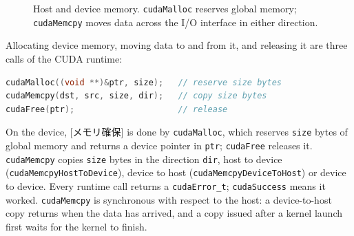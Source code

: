 \documentclass[../main.tex]{subfiles}
\begin{document}
\begin{figure}[tb]
  \centering
  
  \caption{Host and device memory.  \texttt{cudaMalloc} reserves global
    memory; \texttt{cudaMemcpy} moves data across the I/O interface in
    either direction.}
  \label{fig:l03-host-device}
\end{figure}

Allocating device memory, moving data to and from it, and releasing it
are three calls of the CUDA runtime:
\begin{lstlisting}[language=C++, numbers=none]
cudaMalloc((void **)&ptr, size);   // reserve size bytes
cudaMemcpy(dst, src, size, dir);   // copy size bytes
cudaFree(ptr);                     // release
\end{lstlisting}

\begin{definition}
  On the device, [メモリ確保] is done by
  \texttt{cudaMalloc}, which reserves \texttt{size} bytes of global
  memory and returns a device pointer in \texttt{ptr}; \texttt{cudaFree}
  releases it.  \texttt{cudaMemcpy} copies \texttt{size} bytes in the
  direction \texttt{dir}, host to device
  (\texttt{cudaMemcpyHostToDevice}), device to host
  (\texttt{cudaMemcpyDeviceToHost}) or device to device.  Every runtime
  call returns a \texttt{cudaError\_t}; \texttt{cudaSuccess} means it
  worked.  \texttt{cudaMemcpy} is synchronous with respect to the host:
  a device-to-host copy returns when the data has arrived, and a copy
  issued after a kernel launch first waits for the kernel to
  finish.
\end{definition}
\end{document}
